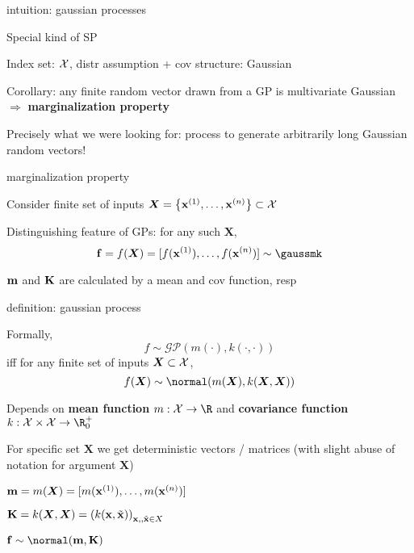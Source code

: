 \documentclass[11pt,compress,t,notes=noshow, xcolor=table]{beamer}
\begin{document}

\begin{framei}[sep=L]{intuition: gaussian processes}
\item Special kind of SP 
\item Index set: $\Xspace$, distr assumption + cov structure: Gaussian 
\item Corollary: any finite random vector drawn from a GP is multivariate Gaussian $\Rightarrow$ \textbf{marginalization property}
\vfill
{}
\vfill
\item Precisely what we were looking for: process to generate arbitrarily long Gaussian random vectors!
\end{framei}

\begin{framei}[sep=L]{marginalization property}
\item Consider finite set of inputs $\bm{X} = \xdat \subset \Xspace$
\item Distinguishing feature of GPs: for any such $\bm{X}$,
    $$
      \fv = f(\bm{X}) = \fvec \sim \gaussmk
    $$ 
\item $\mv$ and $\Kmat$ are calculated by a mean and cov function, resp
\vfill
{}
\end{framei}

\begin{framei}[sep=L]{definition: gaussian process}
\item Formally, 
$$f \sim \mathcal{GP}(m(\cdot), k(\cdot, \cdot))$$
iff for any finite set of inputs $\bm{X} \subset \Xspace$, 
$$
f(\bm{X}) \sim \normal(m(\bm{X}), k(\bm{X}, \bm{X}))
$$
\item Depends on \textbf{mean function} $m: \Xspace \rightarrow \R$ and \textbf{covariance function} $k: \Xspace \times \Xspace \rightarrow \R^+_0$
\item For specific set $\bm{X}$ we get deterministic vectors / matrices (with slight abuse of notation for argument $\bm{X}$)
\vfill
\begin{itemizeM}
\item $\mv = m(\bm{X}) = [m(\xi[1]), \dots, m(\xi[n])]$
\item $\Kmat = k(\bm{X}, \bm{X}) = \left(k(\xv, \tilde{\xv}) \right)_{\xv, , \tilde{\xv} \in X}$
\item $\fv \sim \normal(\mv, \Kmat)$
\end{itemizeM}
\end{framei}
\end{document}
